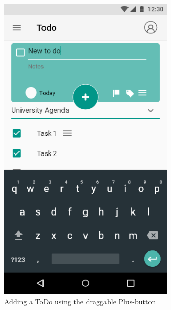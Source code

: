 \documentclass[a4paper,11pt]{article} %
\begin{document}
\begin{figure}[h!]
  \centering
  \includegraphics[width=0.75\textwidth]{img/ui-wireframe/Todo-Add-Action.png}
  \caption{Adding a ToDo using the draggable Plus-button}
\end{figure}
\newpage
\end{document}
